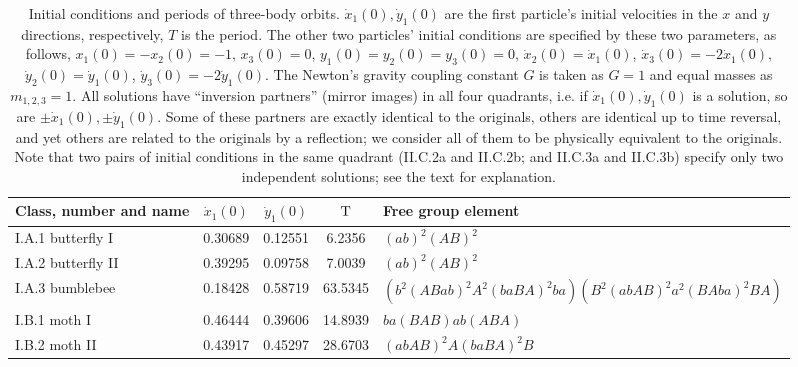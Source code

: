 \documentclass[twocolumn,showpacs,showkeys,preprintnumbers,amsmath,amssymb]{revtex4}
\begin{document}
\begin{table}[tbh]
\begin{center} 
\caption{Initial conditions and periods of three-body orbits.
${\dot x}_{1}(0), {\dot y}_{1}(0)$ are the first particle's initial 
velocities in the $x$ and $y$ directions, respectively, $T$ is the period. 
The other two particles' initial conditions are specified by these two parameters, 
as follows,  
$x_1(0)=-x_2(0)=-1$, $x_3(0)=0$, $y_1(0)=y_2(0)=y_3(0)=0$,  
$\dot x_2(0)=\dot x_1(0)$, $\dot x_3(0)=-2\dot x_1(0)$, $\dot y_2(0)=\dot y_1(0)$,
$\dot y_3(0)=-2\dot y_1(0)$. The Newton's gravity coupling constant $G$ is taken as 
$G=1$ and equal masses as $m_{1,2,3}=1$. 
All solutions have ``inversion partners'' (mirror images) in all four quadrants, i.e. if 
${\dot x}_{1}(0), {\dot y}_{1}(0)$ is a solution, so are $\pm {\dot x}_{1}(0), \pm {\dot y}_{1}(0)$.
Some of these partners are exactly identical to the originals, others are identical up
to time reversal, and yet others are related to the originals by a reflection; we
consider all of them to be physically equivalent to the originals.
Note that two pairs of initial conditions in the same quadrant (II.C.2a and II.C.2b; 
and II.C.3a and II.C.3b) specify only two independent solutions; see 
the text for explanation.}
\begin{tabular}{lc@{\hskip 0.1in}c@{\hskip 0.1in}c@{\hskip 0.1in}l}
\hline \hline 
\setlength
{\rm Class, number and name} & ${\dot x}_{1}(0)$ & ${\dot y}_{1}(0)$ & ${\rm T}$ & {\rm Free group element} \\
\hline
\hline
I.A.1 butterfly I & 0.30689 & 0.12551 & 6.2356 & $(ab)^2 (AB)^2$ \\ %
I.A.2 butterfly II & 0.39295 & 0.09758 & 7.0039 & $(ab)^2 (AB)^2$ \\ %
I.A.3 bumblebee & 0.18428 & 0.58719 & 63.5345 & $(b^2 (ABab)^2 A^2 (baBA)^2 ba) (B^2 (abAB)^2 a^2 (BAba)^2 BA)$  \\ %
\hline
I.B.1 moth I & 0.46444 & 0.39606 & 14.8939 & $ba(BAB)ab(ABA)$ \\ %
I.B.2 moth II & 0.43917 & 0.45297 & 28.6703 &  $(abAB)^2 A (baBA)^2 B$  \\ %

\end{tabular}
\end{center}
\end{table}
\end{document}
